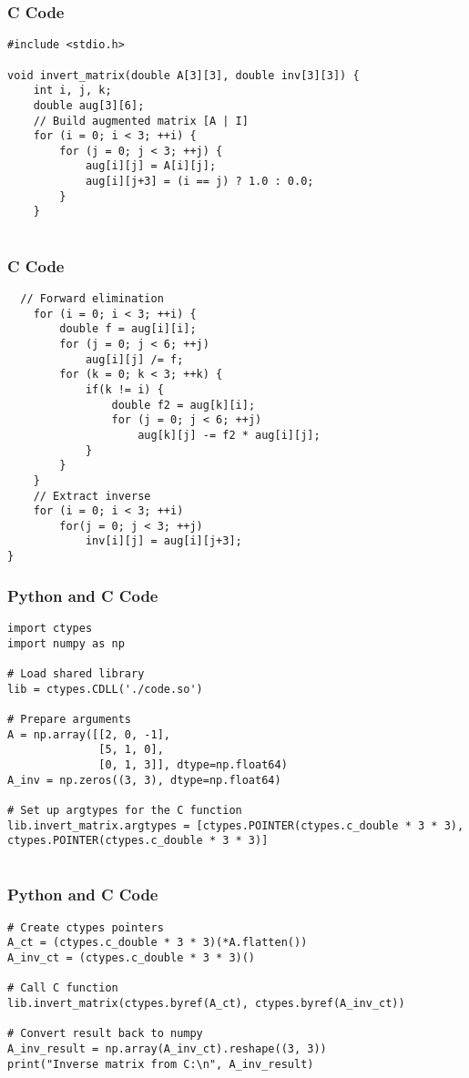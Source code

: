 \documentclass{beamer}
\begin{document}
\begin{frame}[fragile]
\frametitle{C Code}
\begin{lstlisting}
#include <stdio.h>

void invert_matrix(double A[3][3], double inv[3][3]) {
    int i, j, k;
    double aug[3][6];
    // Build augmented matrix [A | I]
    for (i = 0; i < 3; ++i) {
        for (j = 0; j < 3; ++j) {
            aug[i][j] = A[i][j];
            aug[i][j+3] = (i == j) ? 1.0 : 0.0;
        }
    }
          
    \end{lstlisting}

\end{frame}
\begin{frame}[fragile]
\frametitle{C Code}
\begin{lstlisting}
  // Forward elimination
    for (i = 0; i < 3; ++i) {
        double f = aug[i][i];
        for (j = 0; j < 6; ++j)
            aug[i][j] /= f;
        for (k = 0; k < 3; ++k) {
            if(k != i) {
                double f2 = aug[k][i];
                for (j = 0; j < 6; ++j)
                    aug[k][j] -= f2 * aug[i][j];
            }
        }
    }
    // Extract inverse
    for (i = 0; i < 3; ++i)
        for(j = 0; j < 3; ++j)
            inv[i][j] = aug[i][j+3];
}
    \end{lstlisting}

\end{frame}


\begin{frame}[fragile]
\frametitle{Python and C Code}

\begin{lstlisting}
import ctypes
import numpy as np

# Load shared library
lib = ctypes.CDLL('./code.so')

# Prepare arguments
A = np.array([[2, 0, -1],
              [5, 1, 0],
              [0, 1, 3]], dtype=np.float64)
A_inv = np.zeros((3, 3), dtype=np.float64)

# Set up argtypes for the C function
lib.invert_matrix.argtypes = [ctypes.POINTER(ctypes.c_double * 3 * 3), ctypes.POINTER(ctypes.c_double * 3 * 3)]


\end{lstlisting}

\end{frame}

\begin{frame}[fragile]
\frametitle{Python and C Code}

\begin{lstlisting}
# Create ctypes pointers
A_ct = (ctypes.c_double * 3 * 3)(*A.flatten())
A_inv_ct = (ctypes.c_double * 3 * 3)()

# Call C function
lib.invert_matrix(ctypes.byref(A_ct), ctypes.byref(A_inv_ct))

# Convert result back to numpy
A_inv_result = np.array(A_inv_ct).reshape((3, 3))
print("Inverse matrix from C:\n", A_inv_result)

\end{lstlisting}

\end{frame}
\end{document}
